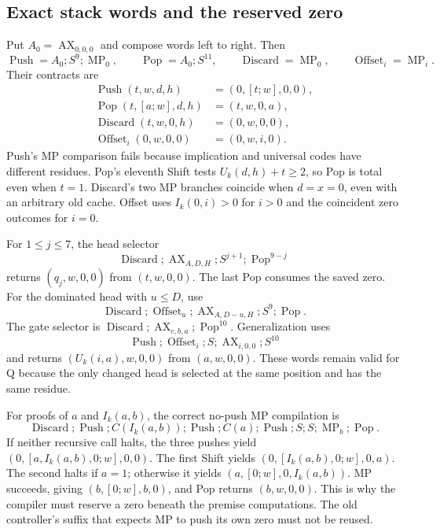 \subsection{Exact stack words and the reserved zero}
Put $A_0=\operatorname{AX}_{0,0,0}$ and compose words left to right. Then
\[
 \operatorname{Push}=A_0;S^9;\operatorname{MP}_0,
 \qquad \operatorname{Pop}=A_0;S^{11},
 \qquad \operatorname{Discard}=\operatorname{MP}_0,
 \qquad \operatorname{Offset}_i=\operatorname{MP}_i.
\]
Their contracts are
\begin{align*}
 \operatorname{Push}(t,w,d,h)&=(0,[t;w],0,0),\\
 \operatorname{Pop}(t,[a;w],d,h)&=(t,w,0,a),\\
 \operatorname{Discard}(t,w,0,h)&=(0,w,0,0),\\
 \operatorname{Offset}_i(0,w,0,0)&=(0,w,i,0).
\end{align*}
Push's MP comparison fails because implication and universal codes have
different residues. Pop's eleventh Shift tests $U_k(d,h)+t\ge2$, so Pop
is total even when $t=1$. Discard's two MP branches coincide when $d=x=0$,
even with an arbitrary old cache. Offset uses $I_k(0,i)>0$ for $i>0$ and
the coincident zero outcomes for $i=0$.

For $1\le j\le7$, the head selector
\[
 \operatorname{Discard};\operatorname{AX}_{A,D,H};
 S^{j+1};\operatorname{Pop}^{9-j}
\]
returns $(q_j,w,0,0)$ from $(t,w,0,0)$. The last Pop consumes the saved
zero. For the dominated head with $u\le D$, use
\[
 \operatorname{Discard};\operatorname{Offset}_u;
 \operatorname{AX}_{A,D-u,H};S^9;\operatorname{Pop}.
\]
The gate selector is
$\operatorname{Discard};\operatorname{AX}_{c,b,a};\operatorname{Pop}^{10}$.
Generalization uses
\[
 \operatorname{Push};\operatorname{Offset}_i;S;
 \operatorname{AX}_{i,0,0};S^{10}
\]
and returns $(U_k(i,a),w,0,0)$ from $(a,w,0,0)$.
These words remain valid for Q because the only changed head is selected
at the same position and has the same residue.

For proofs of $a$ and $I_k(a,b)$, the correct no-push MP compilation is
\[
 \operatorname{Discard};\operatorname{Push};
 C(I_k(a,b));\operatorname{Push};C(a);\operatorname{Push};
 S;S;\operatorname{MP}_b;\operatorname{Pop}.
\]
If neither recursive call halts, the three pushes yield
$(0,[a,I_k(a,b),0;w],0,0)$. The first Shift yields
$(0,[I_k(a,b),0;w],0,a)$. The second halts if $a=1$; otherwise it yields
$(a,[0;w],0,I_k(a,b))$. MP succeeds, giving $(b,[0;w],b,0)$, and Pop
returns $(b,w,0,0)$. This is why the compiler must reserve a zero beneath
the premise computations. The old controller's suffix that expects MP to
push its own zero must not be reused.

